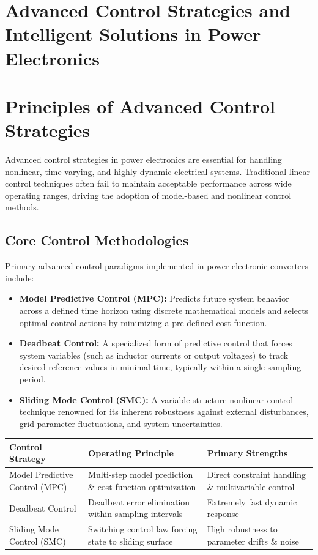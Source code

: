 \documentclass[12pt,a4paper]{article}
\begin{document}
\section*{Advanced Control Strategies and Intelligent Solutions in Power Electronics}

\section{Principles of Advanced Control Strategies}

Advanced control strategies in power electronics are essential for handling nonlinear, time-varying, and highly dynamic electrical systems. Traditional linear control techniques often fail to maintain acceptable performance across wide operating ranges, driving the adoption of model-based and nonlinear control methods.

\subsection{Core Control Methodologies}
Primary advanced control paradigms implemented in power electronic converters include:

\begin{itemize}
    \item \textbf{Model Predictive Control (MPC):} Predicts future system behavior across a defined time horizon using discrete mathematical models and selects optimal control actions by minimizing a pre-defined cost function.
    \item \textbf{Deadbeat Control:} A specialized form of predictive control that forces system variables (such as inductor currents or output voltages) to track desired reference values in minimal time, typically within a single sampling period.
    \item \textbf{Sliding Mode Control (SMC):} A variable-structure nonlinear control technique renowned for its inherent robustness against external disturbances, grid parameter fluctuations, and system uncertainties.
\end{itemize}

\begin{center}
\renewcommand{\arraystretch}{1.4}
\begin{tabularx}{\textwidth}{|>{\raggedright\arraybackslash}p{3.5cm}|X|>{\raggedright\arraybackslash}X|}
\hline
\textbf{Control Strategy} & \textbf{Operating Principle} & \textbf{Primary Strengths} \\
\hline
Model Predictive Control (MPC) & Multi-step model prediction \& cost function optimization & Direct constraint handling \& multivariable control \\
\hline
Deadbeat Control & Deadbeat error elimination within sampling intervals & Extremely fast dynamic response \\
\hline
Sliding Mode Control (SMC) & Switching control law forcing state to sliding surface & High robustness to parameter drifts \& noise \\
\hline
\end{tabularx}
\end{center}
\end{document}
